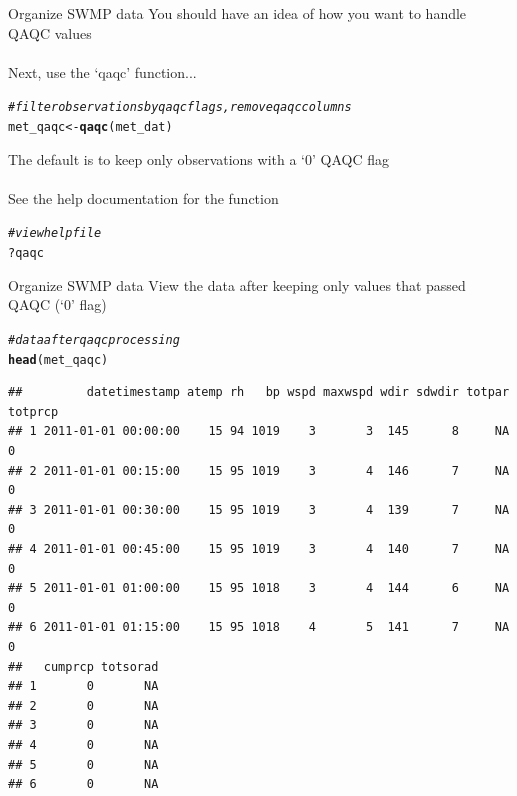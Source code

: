 \documentclass[xcolor=svgnames]{beamer}\usepackage[]{graphicx}\usepackage[]{color}
\makeatletter
\newcommand{\hlcom}[1]{\textcolor[rgb]{0.678,0.584,0.686}{\textit{#1}}}%
\newcommand{\hlopt}[1]{\textcolor[rgb]{0,0,0}{#1}}%
\newcommand{\hlstd}[1]{\textcolor[rgb]{0.345,0.345,0.345}{#1}}%
\newcommand{\hlkwb}[1]{\textcolor[rgb]{0.69,0.353,0.396}{#1}}%
\newcommand{\hlkwd}[1]{\textcolor[rgb]{0.737,0.353,0.396}{\textbf{#1}}}%
\newenvironment{kframe}{%
 \def\at@end@of@kframe{}%
 \ifinner\ifhmode%
  \def\at@end@of@kframe{\end{minipage}}%
  \begin{minipage}{\columnwidth}%
 \fi\fi%
 \def\FrameCommand##1{\hskip\@totalleftmargin \hskip-\fboxsep
 \colorbox{shadecolor}{##1}\hskip-\fboxsep
     \hskip-\linewidth \hskip-\@totalleftmargin \hskip\columnwidth}%
 \MakeFramed {\advance\hsize-\width
   \@totalleftmargin\z@ \linewidth\hsize
   \@setminipage}}%
 {\par\unskip\endMakeFramed%
 \at@end@of@kframe}
\newenvironment{knitrout}{}{} %
\makeatother
\begin{document}
\begin{frame}[containsverbatim]{Organize SWMP data}
You should have an idea of how you want to handle QAQC values \\~\\
Next, use the `qaqc' function...
\begin{knitrout}\scriptsize
{}\color{fgcolor}\begin{kframe}
\begin{alltt}
\hlcom{# filter observations by qaqc flags, remove qaqc columns}
\hlstd{met_qaqc} \hlkwb{<-} \hlkwd{qaqc}\hlstd{(met_dat)}
\end{alltt}
\end{kframe}
\end{knitrout}
The default is to keep only observations with a `0' QAQC flag\\~\\
See the help documentation for the function
\begin{knitrout}\scriptsize
{}\color{fgcolor}\begin{kframe}
\begin{alltt}
\hlcom{# view help file}
\hlopt{?}\hlstd{qaqc}
\end{alltt}
\end{kframe}
\end{knitrout}
\end{frame}

\begin{frame}[containsverbatim]{Organize SWMP data}
View the data after keeping only values that passed QAQC (`0' flag)
\begin{knitrout}\scriptsize
{}\color{fgcolor}\begin{kframe}
\begin{alltt}
\hlcom{# data after qaqc processing}
\hlkwd{head}\hlstd{(met_qaqc)}
\end{alltt}
\begin{verbatim}
##         datetimestamp atemp rh   bp wspd maxwspd wdir sdwdir totpar totprcp
## 1 2011-01-01 00:00:00    15 94 1019    3       3  145      8     NA       0
## 2 2011-01-01 00:15:00    15 95 1019    3       4  146      7     NA       0
## 3 2011-01-01 00:30:00    15 95 1019    3       4  139      7     NA       0
## 4 2011-01-01 00:45:00    15 95 1019    3       4  140      7     NA       0
## 5 2011-01-01 01:00:00    15 95 1018    3       4  144      6     NA       0
## 6 2011-01-01 01:15:00    15 95 1018    4       5  141      7     NA       0
##   cumprcp totsorad
## 1       0       NA
## 2       0       NA
## 3       0       NA
## 4       0       NA
## 5       0       NA
## 6       0       NA
\end{verbatim}
\end{kframe}
\end{knitrout}
\end{frame}
\end{document}
